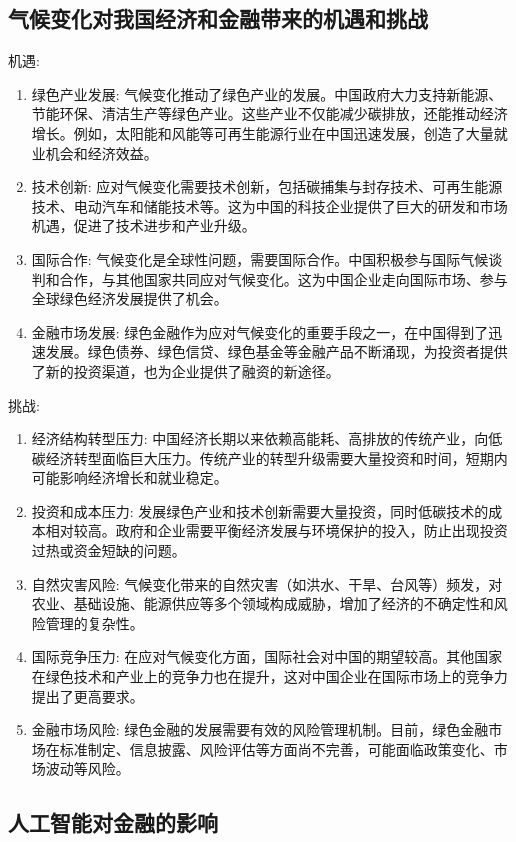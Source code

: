\documentclass{article}
\begin{document}
\subsection{气候变化对我国经济和金融带来的机遇和挑战}

\noindent 机遇:
\begin{enumerate}
	\item 绿色产业发展: 气候变化推动了绿色产业的发展。中国政府大力支持新能源、节能环保、清洁生产等绿色产业。这些产业不仅能减少碳排放，还能推动经济增长。例如，太阳能和风能等可再生能源行业在中国迅速发展，创造了大量就业机会和经济效益。
	\item 技术创新: 应对气候变化需要技术创新，包括碳捕集与封存技术、可再生能源技术、电动汽车和储能技术等。这为中国的科技企业提供了巨大的研发和市场机遇，促进了技术进步和产业升级。
	\item 国际合作: 气候变化是全球性问题，需要国际合作。中国积极参与国际气候谈判和合作，与其他国家共同应对气候变化。这为中国企业走向国际市场、参与全球绿色经济发展提供了机会。
	\item 金融市场发展: 绿色金融作为应对气候变化的重要手段之一，在中国得到了迅速发展。绿色债券、绿色信贷、绿色基金等金融产品不断涌现，为投资者提供了新的投资渠道，也为企业提供了融资的新途径。
\end{enumerate}

\noindent 挑战:
\begin{enumerate}
	\item 经济结构转型压力: 中国经济长期以来依赖高能耗、高排放的传统产业，向低碳经济转型面临巨大压力。传统产业的转型升级需要大量投资和时间，短期内可能影响经济增长和就业稳定。
	\item 投资和成本压力: 发展绿色产业和技术创新需要大量投资，同时低碳技术的成本相对较高。政府和企业需要平衡经济发展与环境保护的投入，防止出现投资过热或资金短缺的问题。
	\item 自然灾害风险: 气候变化带来的自然灾害（如洪水、干旱、台风等）频发，对农业、基础设施、能源供应等多个领域构成威胁，增加了经济的不确定性和风险管理的复杂性。
	\item 国际竞争压力: 在应对气候变化方面，国际社会对中国的期望较高。其他国家在绿色技术和产业上的竞争力也在提升，这对中国企业在国际市场上的竞争力提出了更高要求。
	\item 金融市场风险: 绿色金融的发展需要有效的风险管理机制。目前，绿色金融市场在标准制定、信息披露、风险评估等方面尚不完善，可能面临政策变化、市场波动等风险。
\end{enumerate}

\subsection{人工智能对金融的影响}
\end{document}
